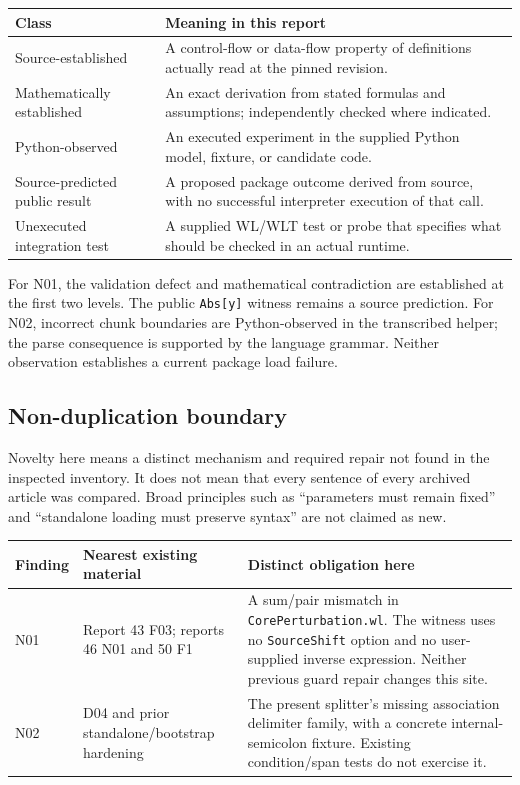 \documentclass[11pt,letterpaper]{article}
\newcommand{\code}[1]{\nolinkurl{#1}}
\begin{document}
\begin{tabularx}{\linewidth}{@{}lY@{}}
\toprule
Class & Meaning in this report\\
\midrule
Source-established & A control-flow or data-flow property of definitions actually read at the pinned revision.\\
Mathematically established & An exact derivation from stated formulas and assumptions; independently checked where indicated.\\
Python-observed & An executed experiment in the supplied Python model, fixture, or candidate code.\\
Source-predicted public result & A proposed package outcome derived from source, with no successful interpreter execution of that call.\\
Unexecuted integration test & A supplied WL/WLT test or probe that specifies what should be checked in an actual runtime.\\
\bottomrule
\end{tabularx}

For N01, the validation defect and mathematical contradiction are established at the first two levels. The public \code{Abs[y]} witness remains a source prediction. For N02, incorrect chunk boundaries are Python-observed in the transcribed helper; the parse consequence is supported by the language grammar. Neither observation establishes a current package load failure.

\subsection{Non-duplication boundary}
Novelty here means a distinct mechanism and required repair not found in the inspected inventory. It does not mean that every sentence of every archived article was compared. Broad principles such as ``parameters must remain fixed'' and ``standalone loading must preserve syntax'' are not claimed as new.

\begin{tabularx}{\linewidth}{@{}lYY@{}}
\toprule
Finding & Nearest existing material & Distinct obligation here\\
\midrule
N01 & Report 43 F03; reports 46 N01 and 50 F1 & A sum/pair mismatch in \code{CorePerturbation.wl}. The witness uses no \code{SourceShift} option and no user-supplied inverse expression. Neither previous guard repair changes this site.\\
N02 & D04 and prior standalone/bootstrap hardening & The present splitter's missing association delimiter family, with a concrete internal-semicolon fixture. Existing condition/span tests do not exercise it.\\
\bottomrule
\end{tabularx}
\end{document}
